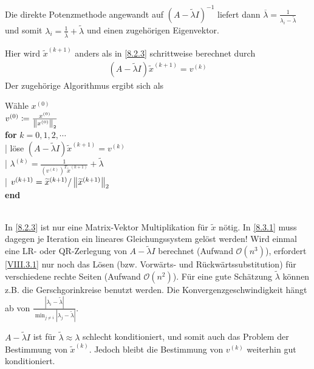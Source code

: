 
Die direkte Potenzmethode angewandt auf
$(A-\widetilde{\lambda}I)^{-1}$
liefert dann
$\overline{\lambda}=\frac{1}{\lambda_i-\widetilde{\lambda}}$
und somit $\lambda_i=\frac{1}{\overline{\lambda}}+\widetilde{\lambda}$
und einen zugehörigen Eigenvektor.


\label{8.3.1}
Hier wird $\widetilde{x}^{(k+1)}$ anders als in \ref{8.2.3}
schrittweise berechnet durch
\begin{gather}
  (A-\widetilde{\lambda}I)\widetilde{x}^{(k+1)}=v^{(k)}
  \label{VIII.3.1}
\end{gather}
Der zugehörige Algorithmus ergibt sich als

\begin{pseudocode}{0.5\linewidth}
  Wähle $x^{(0)}$ \\
  $v^{(0)} \coloneqq \frac{x^{(0)}}{\nn[x^{(0)}]_2} $\\
  \textbf{for} $k=0,1,2,\dotsb$ \\
  |\> löse
  $(A-\widetilde{\lambda}I)\widetilde{x}^{(k+1)}=v^{(k)}$\\
  |\> $\lambda^{(k)} = \frac{1}{\left(v^{(k)}\right)^T \widetilde{x}^{(k+1)}}
  + \widetilde{\lambda}$\\
  |\> $v^{(k+1)} = \widetilde{x}^{(k+1)}/\nn[\widetilde{x}^{(k+1)}]_2$\\
  \textbf{end}
\end{pseudocode}\\

In \ref{8.2.3} ist nur eine Matrix-Vektor Multiplikation für
$\widetilde{x}$ nötig.
In \ref{8.3.1} muss dagegen je Iteration ein lineares Gleichungssystem
gelöst werden!
Wird einmal eine LR- oder QR-Zerlegung von $A-\widetilde{\lambda}I$
berechnet (Aufwand $\mathcal{O}(n^3)$), 
erfordert \eqref{VIII.3.1} nur noch das Lösen
(bzw. Vorwärts- und Rückwärtssubstitution)
für verschiedene rechte Seiten (Aufwand $\mathcal{O}(n^2)$).
Für eine gute Schätzung $\widetilde{\lambda}$ können 
z.B. die Gerschgorinkreise benutzt werden.
Die Konvergenzgeschwindigkeit hängt ab von
$\frac{\left| \lambda_i-\widetilde{\lambda}\right|}
{\min_{j\neq i} \left| \lambda_j-\widetilde{\lambda}\right|}$.

\begin{Beme}\label{8.3.2}\cite[siehe][]{deuflhardhohmann}
  $A-\widetilde{\lambda}I$ ist für $\widetilde{\lambda}\approx\lambda$
  schlecht konditioniert, und somit auch das Problem
  der Bestimmung von $\widetilde{x}^{(k)}$.
  Jedoch bleibt die Bestimmung von $v^{(k)}$ weiterhin gut
  konditioniert.  
\end{Beme}




